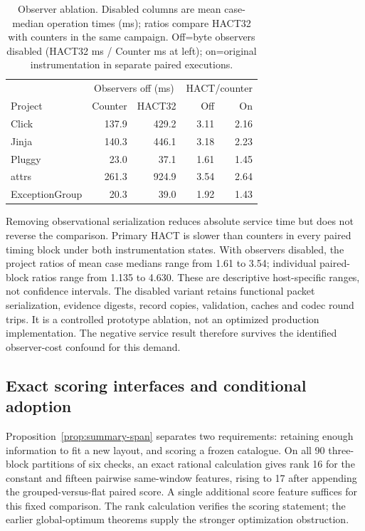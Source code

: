 \documentclass[10pt,journal,compsoc]{IEEEtran}
\theoremstyle{definition}\newtheorem{definition}[theorem]{Definition}
\begin{document}
\begin{table}[t]\centering\footnotesize
\caption{Observer ablation. Disabled columns are mean case-median operation
times (ms); ratios compare HACT32 with counters in the same campaign.
Off=byte observers disabled (HACT32 ms / Counter ms at left);
on=original instrumentation in separate paired executions.}
\label{tab:v12-observer}
\begin{tabular}{@{}lrrrr@{}}\toprule
& \multicolumn{2}{c}{Observers off (ms)} & \multicolumn{2}{c}{HACT/counter}\\
Project & Counter & HACT32 & Off & On\\\midrule
Click & 137.9 & 429.2 & 3.11 & 2.16 \\
Jinja & 140.3 & 446.1 & 3.18 & 2.23 \\
Pluggy & 23.0 & 37.1 & 1.61 & 1.45 \\
attrs & 261.3 & 924.9 & 3.54 & 2.64 \\
ExceptionGroup & 20.3 & 39.0 & 1.92 & 1.43 \\
\bottomrule\end{tabular}\end{table}

Removing observational serialization reduces absolute service time but
does not reverse the comparison. Primary HACT is slower than counters
in every paired timing block under both instrumentation states. With
observers disabled, the project ratios of mean case medians range from
1.61 to 3.54; individual paired-block ratios range from
1.135 to 4.630. These are descriptive host-specific
ranges, not confidence intervals. The disabled variant retains functional
packet serialization, evidence digests, record copies, validation, caches
and codec round trips. It is a controlled prototype ablation, not an optimized
production implementation. The negative service result therefore survives
the identified observer-cost confound for this demand.
\subsection{Exact scoring interfaces and conditional adoption}
Proposition~\ref{prop:summary-span} separates two requirements:
retaining enough information to fit a new layout, and scoring a frozen
catalogue. On all 90 three-block partitions of six checks, an exact
rational calculation gives rank 16 for the constant and fifteen pairwise
same-window features, rising to 17 after appending the grouped-versus-flat
paired score. A single additional score feature suffices for this fixed
comparison. The rank calculation verifies the scoring statement; the
earlier global-optimum theorems supply the stronger optimization obstruction.
\end{document}
